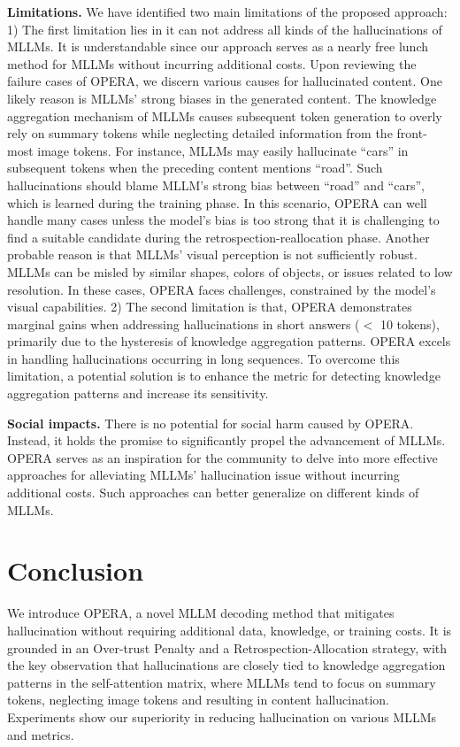 \documentclass[10pt,twocolumn,letterpaper]{article}
\begin{document}
\noindent\textbf{Limitations.} 
We have identified two main limitations of the proposed approach: 
1) The first limitation lies in it can not address all kinds of the hallucinations of MLLMs. 
It is understandable since our approach serves as a nearly free lunch method for MLLMs without incurring additional costs.
Upon reviewing the failure cases of OPERA, we discern various causes for hallucinated content. 
One likely reason is MLLMs' strong biases in the generated content. 
The knowledge aggregation mechanism of MLLMs causes subsequent token generation to overly rely on summary tokens while neglecting detailed information from the front-most image tokens. 
For instance, MLLMs may easily hallucinate ``cars'' in subsequent tokens when the preceding content mentions ``road''. 
Such hallucinations should blame MLLM's strong bias between ``road'' and ``cars'', which is learned during the training phase. 
In this scenario, OPERA can well handle many cases unless the model's bias is too strong that it is challenging to find a suitable candidate during the retrospection-reallocation phase. 
Another probable reason is that MLLMs' visual perception is not sufficiently robust. MLLMs can be misled by similar shapes, colors of objects, or issues related to low resolution. In these cases, OPERA faces challenges, constrained by the model's visual capabilities.
2) The second limitation is that, OPERA demonstrates marginal gains when addressing hallucinations in short answers ($<$ 10 tokens), primarily due to the hysteresis of knowledge aggregation patterns. 
OPERA excels in handling hallucinations occurring in long sequences. To overcome this limitation, a potential solution is to enhance the metric for detecting knowledge aggregation patterns and increase its sensitivity.


\noindent\textbf{Social impacts.} 
There is no potential for social harm caused by OPERA. 
Instead, it holds the promise to significantly propel the advancement of MLLMs.
OPERA serves as an inspiration for the community to delve into more effective approaches for alleviating MLLMs' hallucination issue without incurring additional costs. 
Such approaches can better generalize on different kinds of MLLMs.




\section{Conclusion}

We introduce OPERA, a novel MLLM decoding method that mitigates hallucination without requiring additional data, knowledge, or training costs. 
It is grounded in an Over-trust Penalty and a Retrospection-Allocation strategy, with the key observation that hallucinations are closely tied to knowledge aggregation patterns in the self-attention matrix, where MLLMs tend to focus on summary tokens, neglecting image tokens and resulting in content hallucination. 
Experiments show our superiority in reducing hallucination on various MLLMs and metrics.













{
    \small
    
    
}

% 
\end{document}

